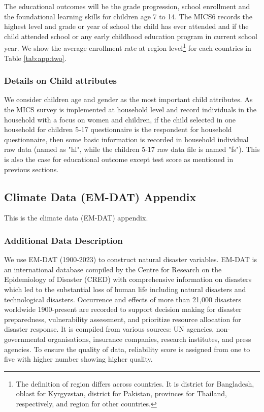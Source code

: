 The educational outcomes will be the grade progression, school enrollment and the foundational learning skills for children age 7 to 14. The MICS6 records the highest level and grade or year of school the child has ever attended and if the child attended school or any early childhood education program in current school year. We show the average enrollment rate at region level\footnote{The definition of region differs across countries. It is district for Bangladesh, oblast for Kyrgyzstan, district for Pakistan, provinces for Thailand, respectively, and region for other countries.} for each countries in Table \ref{tab:app:two}. 

\blindtext

\subsubsection{Details on Child attributes}

We consider children age and gender as the most important child attributes. As the MICS survey is implemented at household level and record individuals in the household with a focus on women and children, if the child selected in one household for children 5-17 questionnaire is the respondent for household questionnaire, then some basic information is recorded in household individual raw data (named as "hl", while the children 5-17 raw data file is named "fs"). This is also the case for educational outcome except test score as mentioned in previous sections. 

\blindtext 

\subsection{Climate Data (EM-DAT) Appendix\label{Data_Appendix_Climate}}

This is the climate data (EM-DAT) appendix. \blindtext 

\subsubsection{Additional Data Description}

We use EM-DAT (1900-2023) to construct natural disaster variables. EM-DAT is an international database compiled by the Centre for Research on the Epidemiology of Disaster (CRED) with comprehensive information on disasters which led to the substantial loss of human life including natural disasters and technological disasters. Occurrence and effects of more than 21,000 disasters worldwide 1900-present are recorded to support decision making for disaster preparedness, vulnerability assessment, and prioritize resource allocation for disaster response. 
It is compiled from various sources: UN agencies, non-governmental organisations, insurance companies, research institutes, and press agencies. To ensure the quality of data, reliability score is assigned from one to five with higher number showing higher quality. 

